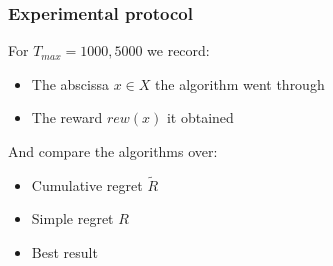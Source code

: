 \documentclass[xcolor={usenames,dvipsnames}]{beamer}
\begin{document}
\begin{frame}
\frametitle{Experimental protocol}
For $T_{max}=1000,5000$ we record:
\begin{itemize}
	\item The abscissa $x \in X$ the algorithm went through
	\item The reward $rew(x)$ it obtained
\end{itemize}
And compare the algorithms over:
\begin{itemize}
	\item Cumulative regret $\tilde{R}$
	\item Simple regret $R$
	\item Best result
\end{itemize}

\end{frame}
\end{document}

